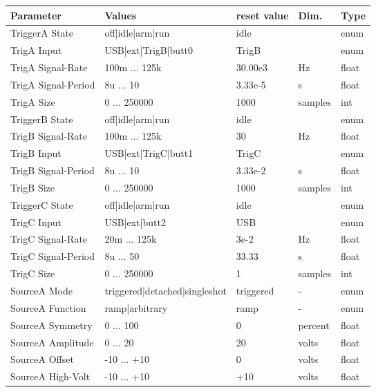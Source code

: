 			\begin{table}[H]
			\centering
			\scriptsize
			\begin{tabular}{l|p{65mm}|l|l|l}
			\redrow Parameter 	& Values						& reset value 	& Dim.		& Type 	\\ \hline
			TriggerA State		& off|idle|arm|run				& idle			& 			& enum	\\ \hline
			TrigA Input			& USB|ext|TrigB|butt0 			& TrigB			& 			& enum	\\ \hline
			TrigA Signal-Rate	& 100m ... 125k					& 30.00e3		& Hz		& float	\\ \hline
			TrigA Signal-Period	& 8u ... 10						& 3.33e-5		& s			& float	\\ \hline
			TrigA Size			& 0	... 250000	 				& 1000			& samples	& int	\\ \hline
			TriggerB State		& off|idle|arm|run 				& idle			& 			& enum	\\ \hline
			TrigB Signal-Rate	& 100m ... 125k					& 30			& Hz		& float	\\ \hline
			TrigB Input			& USB|ext|TrigC|butt1 			& TrigC			& 			& enum	\\ \hline
			TrigB Signal-Period	& 8u ... 10						& 3.33e-2		& s			& float	\\ \hline
			TrigB Size			& 0	... 250000	 				& 1000			& samples	& int	\\ \hline
			TriggerC State		& off|idle|arm|run				& idle			& 			& enum	\\ \hline
			TrigC Input			& USB|ext|butt2					& USB			& 			& enum	\\ \hline
			TrigC Signal-Rate	& 20m ... 125k					& 3e-2			& Hz		& float	\\ \hline
			TrigC Signal-Period	& 8u ... 50						& 33.33			& s			& float	\\ \hline
			TrigC Size			& 0 ... 250000					& 1				& samples	& int	\\ \hline
			SourceA Mode		& triggered|detached|singleshot	& triggered		& -			& enum	\\ \hline
			SourceA Function	& ramp|arbitrary 				& ramp			& -			& enum	\\ \hline
			SourceA Symmetry	& 	0 ... 100					& 0				& percent	& float	\\ \hline
			SourceA Amplitude	& 	0 ... 20					& 20			& volts		& float	\\ \hline
			SourceA Offset		& -10 ... +10					& 0				& volts		& float	\\ \hline
			SourceA High-Volt	& -10 ... +10					& +10			& volts		& float	\\ \hline

\end{tabular}
\end{table}
